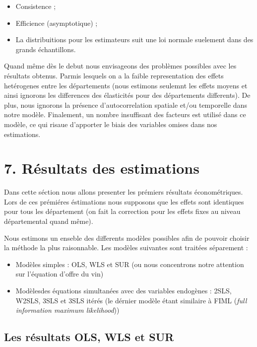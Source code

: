 \documentclass[11pt,]{article}
\providecommand{\tightlist}{%
  \setlength{\itemsep}{0pt}\setlength{\parskip}{0pt}}
\begin{document}
\begin{itemize}
\tightlist
\item
  Consistence ;
\item
  Efficience (asymptotique) ;
\item
  La distribuitions pour les estimateurs suit une loi normale suelement
  dans des grands échantillons.
\end{itemize}

Quand même dès le debut nous envisageons des problèmes possibles avec
les résultats obtenus. Parmis lesquels on a la faible representation des
effets hetérogenes entre les départements (nous estimons seulemnt les
effets moyens et ainsi ignorons les differences des élasticités pour des
départements differents). De plus, nous ignorons la présence
d'autocorrelation spatiale et/ou temporelle dans notre modèle.
Finalement, un nombre insuffisant des facteurs est utilisé dans ce
modèle, ce qui risaue d'apporter le biais des variables omises dans nos
estimations.

\hypertarget{resultats-des-estimations}{%
\section{7. Résultats des estimations}\label{resultats-des-estimations}}

Dans cette séction nous allons presenter les prémiers résultats
économétriques. Lors de ces prémiéres éstimations nous supposons que les
effets sont identiques pour tous les département (on fait la correction
pour les effets fixes au niveau départemental quand même).

Nous estimons un enseble des differents modèles possibles afin de
pouvoir choisir la méthode la plus raisonnable. Les modèles suivantes
sont traitées séparement :

\begin{itemize}
\tightlist
\item
  Modèles simples : OLS, WLS et SUR (ou nous concentrons notre attention
  sur l'équation d'offre du vin)
\item
  Modèlesdes équations simultanées avec des variables endogènes : 2SLS,
  W2SLS, 3SLS et 3SLS itérés (le dérnier modèle étant similaire à FIML
  (\emph{full information maximum likelihood}))
\end{itemize}

\hypertarget{les-resultats-ols-wls-et-sur}{%
\subsection{Les résultats OLS, WLS et
SUR}\label{les-resultats-ols-wls-et-sur}}
\end{document}
